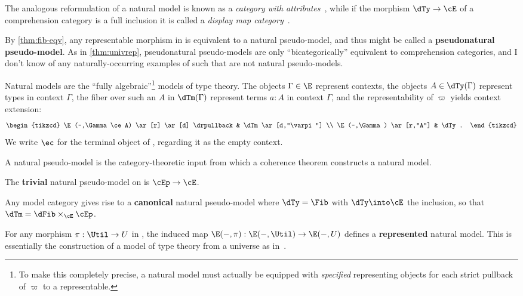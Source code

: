 The analogous reformulation of a natural model is known as a \emph{category with attributes}~\cite{cartmell:gatcc,hofmann:ssdts}, while if the morphism $\dTy\to\cE$ of a comprehension category is a full inclusion it is called a \emph{display map category}~\cite{taylor:pracfdn}.

\begin{rmk}
  By \cref{thm:fib-eqv}, any representable morphism in \Ehat is equivalent to a natural pseudo-model, and thus might be called a \textbf{pseudonatural pseudo-model}.
  As in \cref{thm:univrep}, pseudonatural pseudo-models are only ``bicategorically'' equivalent to comprehension categories, and I don't know of any naturally-occurring examples of such that are not natural pseudo-models.
\end{rmk}

Natural models are the ``fully algebraic''\footnote{To make this completely precise, a natural model must actually be equipped with \emph{specified} representing objects for each strict pullback of $\varpi$ to a representable.} models of type theory.
The objects $\Gamma\in\E$ represent contexts, the objects $A\in \dTy(\Gamma)$ represent types in context $\Gamma$, the fiber over such an $A$ in $\dTm(\Gamma)$ represent terms $a:A$ in context $\Gamma$, and the representability of $\varpi$ yields context extension:
\[
  \begin{tikzcd}
    \E(-,\Gamma\ce A) \ar[r] \ar[d] \drpullback & \dTm \ar[d,"\varpi"] \\
    \E(-,\Gamma) \ar[r,"A"] & \dTy.
  \end{tikzcd}
\]
We write $\ec$ for the terminal object of \E, regarding it as the empty context.

A natural pseudo-model is the category-theoretic input from which a coherence theorem constructs a natural model.

\begin{eg}
  The \textbf{trivial} natural pseudo-model on \E is $\cEp \to \cE$.
\end{eg}

\begin{eg}\label{eg:cc-can}
  Any model category \E gives rise to a \textbf{canonical} natural pseudo-model where $\dTy=\Fib$ with $\dTy\into\cE$ the inclusion, so that $\dTm = \dFib \times_\cE \cEp$.
\end{eg}

\begin{eg}\label{eg:rep-cwf}
  For any morphism $\pi:\Util\to U$ in \E, the induced map $\E(-,\pi) : \E(-,\Util) \to \E(-,U)$ defines a \textbf{represented} natural model.
  This is essentially the construction of a model of type theory from a universe as in~\cite[]{klv:ssetmodel}.
\end{eg}

